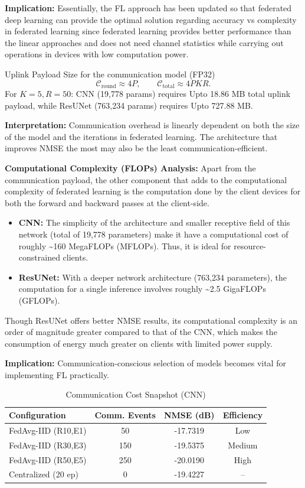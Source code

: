 \documentclass{llncs}
\begin{document}
\textbf{Implication:} Essentially, the FL approach has been updated so that federated deep learning can provide the optimal solution regarding accuracy vs complexity in federated learning since federated learning provides better performance than the linear approaches and does not need channel statistics while carrying out operations in devices with low computation power.

Uplink Payload Size for the communication model (FP32)
\begin{equation}
\mathcal{C}_{\text{round}}\approx 4P,\qquad
\mathcal{C}_{\text{total}}\approx 4PKR.
\end{equation}
For $K{=}5, R{=}50$: CNN (19,778 params) requires Upto 18.86 MB total uplink payload, while ResUNet (763,234 params) requires Upto 727.88 MB.

\textbf{Interpretation:} Communication overhead is linearly dependent on both the size of the model and the iterations in federated learning. The architecture that improves NMSE the most may also be the least communication-efficient.

\textbf{Computational Complexity (FLOPs) Analysis:} Apart from the communication payload, the other component that adds to the computational complexity of federated learning is the computation done by the client devices for both the forward and backward passes at the client-side.
\begin{itemize}
    \item \textbf{CNN:} The simplicity of the architecture and smaller receptive field of this network (total of 19,778 parameters) make it have a computational cost of roughly \textasciitilde 160 MegaFLOPs (MFLOPs). Thus, it is ideal for resource-constrained clients. 
    \item \textbf{ResUNet:} With a deeper network architecture (763,234 parameters), the
computation for a single inference involves roughly \textasciitilde 2.5 GigaFLOPs (GFLOPs).
\end{itemize}
Though ResUNet offers better NMSE results, its computational complexity is an order of magnitude greater compared to that of the CNN, which makes the consumption of energy much greater on clients with limited power supply.

\textbf{Implication:} Communication-conscious selection of models becomes vital for implementing FL practically.



\begin{table}[htbp]
\caption{Communication Cost Snapshot (CNN)}
\label{tab:comm}
\centering
\begin{tabular}{lccc}
\toprule
Configuration & Comm. Events & NMSE (dB) & Efficiency \\
\midrule
FedAvg-IID (R10,E1) & 50 & -17.7319 & Low \\
FedAvg-IID (R30,E3) & 150 & -19.5375 & Medium \\
FedAvg-IID (R50,E5) & 250 & -20.0190 & High \\
Centralized (20 ep) & 0 & -19.4227 & -- \\
\bottomrule
\end{tabular}
\end{table}
\end{document}
